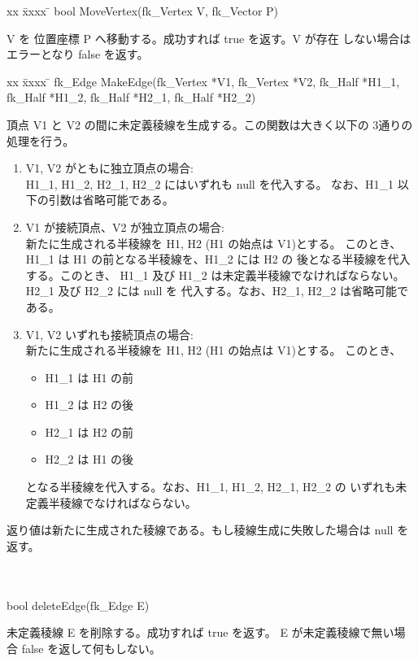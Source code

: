 
\begin{tabbing}
xx \= xxxx \= \kill
 \> bool MoveVertex(fk\_Vertex V, fk\_Vector P) \\
	\> \> \begin{minipage}[]{15cm}
		V を 位置座標 P へ移動する。成功すれば true を返す。V が存在
		しない場合はエラーとなり false を返す。
	\end{minipage}
\end{tabbing}

\newpage
\begin{tabbing}
xx \= xxxx \= \kill
 \> fk\_Edge MakeEdge(fk\_Vertex *V1, fk\_Vertex *V2, fk\_Half *H1\_1, fk\_Half *H1\_2,
	fk\_Half *H2\_1, fk\_Half *H2\_2) \\
	\> \> \begin{minipage}[]{15cm}
		頂点 V1 と V2 の間に未定義稜線を生成する。この関数は大きく以下の
		3通りの処理を行う。

		\begin{enumerate}
		 \item V1, V2 がともに独立頂点の場合: \\
			H1\_1, H1\_2, H2\_1, H2\_2 にはいずれも null を代入する。
			なお、H1\_1 以下の引数は省略可能である。

		 \item V1 が接続頂点、V2 が独立頂点の場合: \\
			新たに生成される半稜線を H1, H2 (H1 の始点は V1)とする。
	 		このとき、H1\_1 は H1 の前となる半稜線を、H1\_2 には H2 の
			後となる半稜線を代入する。このとき、
			H1\_1 及び H1\_2 は未定義半稜線でなければならない。
			H2\_1 及び H2\_2 には null を
			代入する。なお、H2\_1, H2\_2 は省略可能である。

		 \item V1, V2 いずれも接続頂点の場合: \\
			新たに生成される半稜線を H1, H2 (H1 の始点は V1)とする。
			このとき、
			\begin{itemize}
			 \item H1\_1 は H1 の前
			 \item H1\_2 は H2 の後
			 \item H2\_1 は H2 の前
			 \item H2\_2 は H1 の後
			\end{itemize}
			となる半稜線を代入する。なお、H1\_1, H1\_2, H2\_1, H2\_2 の
			いずれも未定義半稜線でなければならない。
		\end{enumerate}
		返り値は新たに生成された稜線である。もし稜線生成に失敗した場合は
		null を返す。
	\end{minipage} \\ \\
 \> bool deleteEdge(fk\_Edge E) \\
	\> \> \begin{minipage}[]{15cm}
	   	未定義稜線 E を削除する。成功すれば true を返す。
		E が未定義稜線で無い場合 false を返して何もしない。
	\end{minipage}
\end{tabbing}

